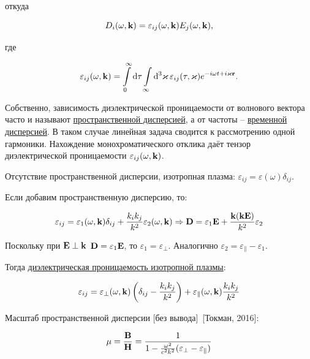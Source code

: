 \documentclass[10pt, a4paper]{article}
\newcommand{\Tokman}{~[Токман, 2016]}
\begin{document}
откуда

\begin{equation*}
	D_i(\omega, \vb{k}) = \varepsilon_{ij} (\omega, \vb{k}) E_j(\omega, \vb{k}),
\end{equation*}

где

\begin{equation*}
	\varepsilon_{ij} (\omega, \vb{k}) = \int\limits_0^\infty \dd{\tau}\int\limits_\infty\dd[3]{\varkappa}\varepsilon_{ij}(\tau,\vb{\varkappa})e^{-i\omega t+ i\vb{\varkappa}\vb{r}}.
\end{equation*}

Собственно, зависимость диэлектрической проницаемости от волнового вектора часто и называют \uline{пространственной дисперсией}, а от частоты -- \uline{временной дисперсией}. В таком случае линейная задача сводится к рассмотрению одной гармоники. Нахождение монохроматического отклика даёт тензор диэлектрической проницаемости $\varepsilon_{ij} (\omega, \vb{k})$.

Отсутствие пространственной дисперсии, изотропная плазма: $\varepsilon_{ij} = \varepsilon(\omega)\delta_{ij}$. 

Если добавим пространственную дисперсию, то:

\begin{equation*}
	\varepsilon_{ij} = \varepsilon_1 (\omega, \vb{k})\delta_{ij}+\frac{k_ik_j}{k^2}\varepsilon_2(\omega, \vb{k}) \Rightarrow \vb{D} = \varepsilon_1\vb{E}+\frac{\vb{k}(\vb{k}\vb{E})}{k^2}\varepsilon_2
\end{equation*}

Поскольку при $\vb{E}\perp\vb{k}$ $\vb{D} = \varepsilon_1\vb{E}$, то $\varepsilon_1=\varepsilon_\perp$. Аналогично $\varepsilon_2 = \varepsilon_\parallel-\varepsilon_1$.

Тогда \uline{диэлектрическая проницаемость изотропной плазмы}:

\begin{equation*}
	\varepsilon_{ij} = \varepsilon_\perp (\omega, \vb{k})\left( \delta_{ij}-\frac{k_ik_j}{k^2}\right) + \varepsilon_\parallel(\omega, \vb{k})\frac{k_ik_j}{k^2}
\end{equation*}

Масштаб пространственной дисперсии [без вывода]\Tokman:

\begin{equation*}
	\mu = \frac{\vb{B}}{\vb{H}} = \frac{1}{1-\frac{\omega^2}{c^2k^2}(\varepsilon_\perp-\varepsilon_\parallel)}
\end{equation*}
\end{document}
